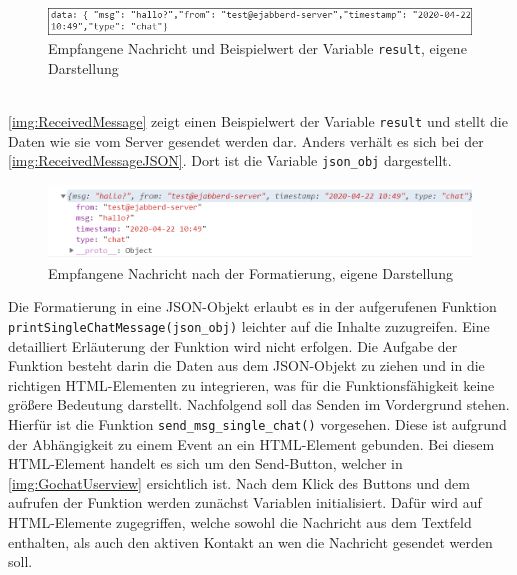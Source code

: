 \documentclass[a4paper,titlepage,halfparskip,12pt]{scrreprt}
\begin{document}
\begin{onehalfspacing}
\begin{figure}[h]
	\centering
	\includegraphics[scale=1.2]{images/GochatAusgabeEmpfangenerNachrichtBearbeitet}
	\caption{Empfangene Nachricht und Beispielwert der Variable \texttt{result}, eigene Darstellung}
	\label{img:ReceivedMessage}
\end{figure}\\
\autoref{img:ReceivedMessage} zeigt einen Beispielwert der Variable \texttt{result} und stellt die Daten wie sie vom Server gesendet werden dar. Anders verhält es sich bei der \autoref{img:ReceivedMessageJSON}. Dort ist die Variable \texttt{json\_obj} dargestellt.
\begin{figure}[h]
	\centering
	\includegraphics[width=\textwidth]{images/GochatAusgabeEmpfangenerNachrichtJSONformat}
	\caption{Empfangene Nachricht nach der Formatierung, eigene Darstellung}
	\label{img:ReceivedMessageJSON}
\end{figure}
Die Formatierung in eine JSON-Objekt erlaubt es in der aufgerufenen Funktion \texttt{printSingleChatMessage(json\_obj)} leichter auf die Inhalte zuzugreifen. Eine detailliert Erläuterung der Funktion wird nicht erfolgen. Die Aufgabe der Funktion besteht darin die Daten aus dem JSON-Objekt zu ziehen und in die richtigen \ac{HTML}-Elementen zu integrieren, was für die Funktionsfähigkeit keine größere Bedeutung darstellt. Nachfolgend soll das Senden im Vordergrund stehen. Hierfür ist die Funktion \texttt{send\_msg\_single\_chat()} vorgesehen. Diese ist aufgrund der Abhängigkeit zu einem Event an ein \ac{HTML}-Element gebunden. Bei diesem \ac{HTML}-Element handelt es sich um den \glqq Send\grqq-Button, welcher in \autoref{img:GochatUserview} ersichtlich ist. Nach dem Klick des Buttons und dem aufrufen der Funktion werden zunächst Variablen initialisiert. Dafür wird auf \ac{HTML}-Elemente zugegriffen, welche sowohl die Nachricht aus dem Textfeld enthalten, als auch den aktiven Kontakt an wen die Nachricht gesendet werden soll.
\begin{lstlisting}[language=Javascript,caption=Initialisierung der Variablen zum Senden einer Nachricht ,label={lst:SendFunctionInitalisation}]

\end{lstlisting}
\end{onehalfspacing}
\end{document}
